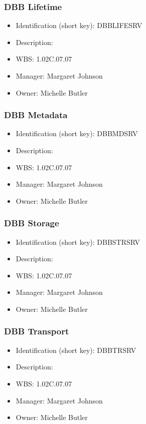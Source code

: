 \subsubsection{DBB Lifetime}\label{sect:DBBLIFESRV}
\begin{itemize}
\item Identification (short key): DBBLIFESRV
\item Description: 
\item WBS: 1.02C.07.07
\item Manager: Margaret Johnson
\item Owner: Michelle Butler
\end{itemize}

\subsubsection{DBB Metadata}\label{sect:DBBMDSRV}
\begin{itemize}
\item Identification (short key): DBBMDSRV
\item Description: 
\item WBS: 1.02C.07.07
\item Manager: Margaret Johnson
\item Owner: Michelle Butler
\end{itemize}

\subsubsection{DBB Storage}\label{sect:DBBSTRSRV}
\begin{itemize}
\item Identification (short key): DBBSTRSRV
\item Description: 
\item WBS: 1.02C.07.07
\item Manager: Margaret Johnson
\item Owner: Michelle Butler
\end{itemize}

\subsubsection{DBB Transport}\label{sect:DBBTRSRV}
\begin{itemize}
\item Identification (short key): DBBTRSRV
\item Description: 
\item WBS: 1.02C.07.07
\item Manager: Margaret Johnson
\item Owner: Michelle Butler
\end{itemize}

